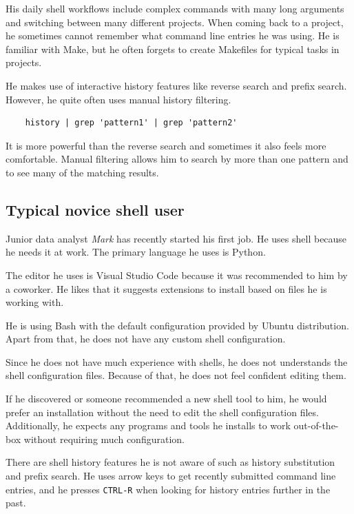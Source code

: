His daily shell workflows include complex commands with many long arguments and switching between many different projects. When coming back to a project, he sometimes cannot remember what command line entries he was using. He is familiar with Make, but he often forgets to create Makefiles for typical tasks in projects.

He makes use of interactive history features like reverse search and prefix search. However, he quite often uses manual history filtering.

\begin{verbatim}
    history | grep 'pattern1' | grep 'pattern2'     
\end{verbatim}

It is more powerful than the reverse search and sometimes it also feels more comfortable. Manual filtering allows him to search by more than one pattern and to see many of the matching results. 

\subsection{Typical novice shell user}

Junior data analyst \textit{Mark} has recently started his first job. He uses shell because he needs it at work. The primary language he uses is Python. 

The editor he uses is Visual Studio Code because it was recommended to him by a coworker. He likes that it suggests extensions to install based on files he is working with.

He is using Bash with the default configuration provided by Ubuntu distribution. Apart from that, he does not have any custom shell configuration. 

Since he does not have much experience with shells, he does not understands the shell configuration files. Because of that, he does not feel confident editing them. 

If he discovered or someone recommended a new shell tool to him, he would prefer an installation without the need to edit the shell configuration files. Additionally, he expects any programs and tools he installs to work out-of-the-box without requiring much configuration. 

There are shell history features he is not aware of such as history substitution and prefix search. He uses arrow keys to get recently submitted command line entries, and he presses \verb|CTRL-R| when looking for history entries further in the past. 



